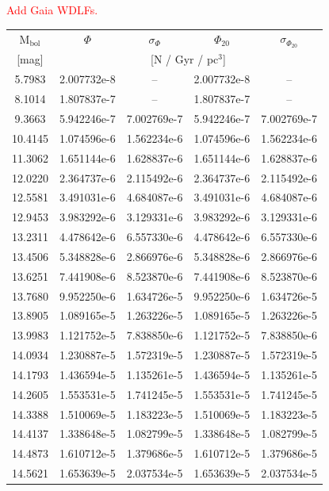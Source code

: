 \documentclass[fleqn,usenatbib]{mnras}
\begin{document}
\textcolor{red}{Add Gaia WDLFs.}

\begin{table}
    \centering
    \begin{tabular}{c|cccc}
         M$_{\mathrm{bol}}$ & $\Phi$ & $\sigma_{\Phi}$ & $\Phi_{20}$ & $\sigma_{\Phi_{20}}$ \\
         {[mag]} & \multicolumn{4}{c}{[N / Gyr / pc$^3$]}\\\hline\hline

5.7983 & 2.007732e-8 & -- & 2.007732e-8 & --\\
8.1014 & 1.807837e-7 & -- & 1.807837e-7 & --\\
9.3663 & 5.942246e-7 & 7.002769e-7 & 5.942246e-7 & 7.002769e-7\\
10.4145 & 1.074596e-6 & 1.562234e-6 & 1.074596e-6 & 1.562234e-6\\
11.3062 & 1.651144e-6 & 1.628837e-6 & 1.651144e-6 & 1.628837e-6\\
12.0220 & 2.364737e-6 & 2.115492e-6 & 2.364737e-6 & 2.115492e-6\\
12.5581 & 3.491031e-6 & 4.684087e-6 & 3.491031e-6 & 4.684087e-6\\
12.9453 & 3.983292e-6 & 3.129331e-6 & 3.983292e-6 & 3.129331e-6\\
13.2311 & 4.478642e-6 & 6.557330e-6 & 4.478642e-6 & 6.557330e-6\\
13.4506 & 5.348828e-6 & 2.866976e-6 & 5.348828e-6 & 2.866976e-6\\\hline
13.6251 & 7.441908e-6 & 8.523870e-6 & 7.441908e-6 & 8.523870e-6\\
13.7680 & 9.952250e-6 & 1.634726e-5 & 9.952250e-6 & 1.634726e-5\\
13.8905 & 1.089165e-5 & 1.263226e-5 & 1.089165e-5 & 1.263226e-5\\
13.9983 & 1.121752e-5 & 7.838850e-6 & 1.121752e-5 & 7.838850e-6\\
14.0934 & 1.230887e-5 & 1.572319e-5 & 1.230887e-5 & 1.572319e-5\\
14.1793 & 1.436594e-5 & 1.135261e-5 & 1.436594e-5 & 1.135261e-5\\
14.2605 & 1.553531e-5 & 1.741245e-5 & 1.553531e-5 & 1.741245e-5\\
14.3388 & 1.510069e-5 & 1.183223e-5 & 1.510069e-5 & 1.183223e-5\\
14.4137 & 1.338648e-5 & 1.082799e-5 & 1.338648e-5 & 1.082799e-5\\
14.4873 & 1.610712e-5 & 1.379686e-5 & 1.610712e-5 & 1.379686e-5\\\hline
14.5621 & 1.653639e-5 & 2.037534e-5 & 1.653639e-5 & 2.037534e-5\\

\end{tabular}
\end{table}
\end{document}
